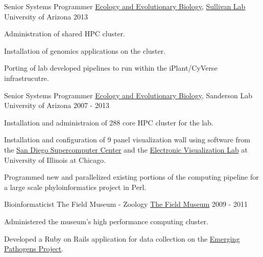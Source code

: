 \begin{cventries}
  \cventry
    {Senior Systems Programmer} %
    {\href{http://eeb.arizona.edu/}{Ecology and Evolutionary Biology}, \href{https://u.osu.edu/viruslab/}{Sullivan Lab}} %
    {University of Arizona} %
    {2013} %
    {
      \begin{cvitems} %
        \item {Administration of shared HPC cluster.}
        \item {Installation of genomics applications on the cluster.}
        \item {Porting of lab developed pipelines to run within the iPlant/CyVerse infrastrucutre.}
      \end{cvitems}
    }

  \cventry
    {Senior Systems Programmer} %
    {\href{http://eeb.arizona.edu/}{Ecology and Evolutionary Biology}, Sanderson Lab} %
    {University of Arizona} %
    {2007 - 2013} %
    {
      \begin{cvitems} %
        \item {Installation and administraion of 288 core HPC cluster for the lab.}
        \item {Installation and configuration of 9 panel visualization wall using software from the \href{http://www.sdsc.edu/}{San Diego Supercomputer Center} and the \href{https://www.evl.uic.edu/}{Electronic Visualization Lab} at University of Illinois at Chicago.}
        \item {Programmed new and parallelized existing portions of the computing pipeline for a large scale phyloinformatics project in Perl.}
      \end{cvitems}
    }

  \cventry
    {Bioinformaticist} %
    {The Field Museum - Zoology} %
    {\href{https://www.fieldmuseum.org/}{The Field Museum}} %
    {2009 - 2011} %
    {
      \begin{cvitems} %
        \item {Administered the museum's high performance computing cluster.}
        \item {Developed a Ruby on Rails application for data collection on the \href{https://www.fieldmuseum.org/emerging-pathogens-project}{Emerging Pathogens Project}.}
      \end{cvitems}
    }


\end{cventries}
